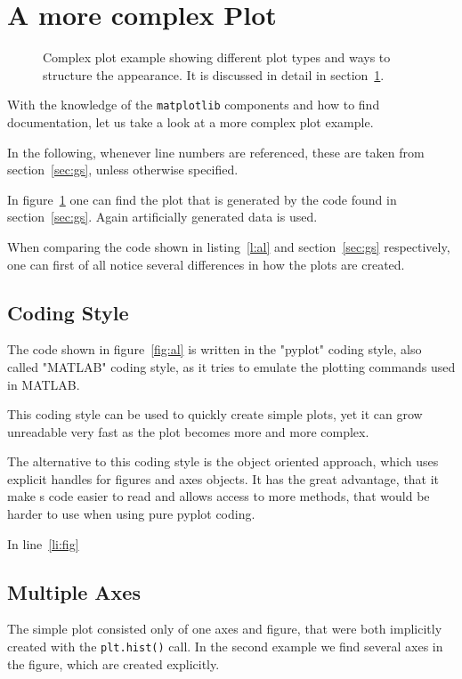 \documentclass[a4paper, 11pt, onecolumn]{article}
\newcommand{\mpl}{\texttt{matplotlib}\xspace}
\newcommand{\pl}[1]{\mbox{\texttt{#1}\xspace}}
\newcommand{\baseref}[3]{\mbox{#1 \ref{#2:#3}\xspace}}
\newcommand{\fig}[1]{\baseref{figure}{fig}{#1}}
\renewcommand{\sec}[1]{\baseref{section}{sec}{#1}}
\newcommand{\lis}[1]{\baseref{listing}{l}{#1}}
\newcommand{\lin}[1]{\baseref{line}{li}{#1}}
\begin{document}
\section{A more complex Plot}

\label{sec:plt}

\begin{figure}[ht!]
\centering

\caption{Complex plot example showing different plot types and ways to
         structure the appearance. It is discussed in detail in \sec{plt}.}
\label{fig:gs}
\end{figure}

With the knowledge of the \mpl components and how to find documentation, let us
take a look at a more complex plot example.


In the following, whenever line numbers are referenced, these are taken from
\sec{gs}, unless otherwise specified.

In \fig{gs} one can find the plot that is generated by the code
found in \sec{gs}. Again artificially generated data is used.

When comparing the code shown in \lis{al} and \sec{gs}
respectively, one can first of all notice several differences in how the plots
are created.

\subsection{Coding Style}
The code shown in \fig{al} is written in the "pyplot" coding style,
also called "MATLAB" coding style, as it tries to emulate the plotting commands
used in MATLAB.

This coding style can be used to quickly create simple plots, yet it can
grow unreadable very fast as the plot becomes more and more complex.

The alternative to this coding style is the object oriented approach, which 
uses explicit handles for figures and axes objects. It has the great advantage,
that it make s code easier to read and allows access to more methods, that 
would be harder to use when using pure pyplot coding.

In \lin{fig} 


\subsection{Multiple Axes}

The simple plot consisted only of one axes and figure, that were both
implicitly created with the \pl{plt.hist()} call. In the second example we find
several axes in the figure, which are created explicitly.
\end{document}
